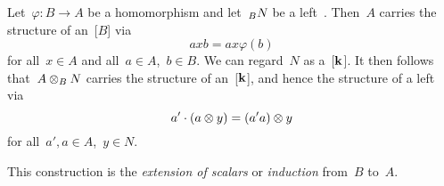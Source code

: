 \begin{remark}
  Let~$\varphi \colon B \to A$ be a {\kalg} homomorphism and let~$\indmodule[B]{N}$ be a left~{}.
  Then~$A$ carries the structure of an~{[$B$]} via
  \[
      a x b
    = a x \varphi(b)
  \]
  for all~$x \in A$ and all~$a \in A$,~$b \in B$.
  We can regard~$N$ as a~{[$\mathbf{k}$]}.
  It then follows that~$A \otimes_B N$ carries the structure of an~{[$\mathbf{k}$]}, and hence the structure of a left~{} via
  \[
      a' \cdot (a \otimes y)
    = (a' a) \otimes y
  \]
  for all~$a',a \in A$,~$y \in N$.
  
  This construction is the \emph{extension of scalars} or \emph{induction} from~$B$ to~$A$.
\end{remark}


